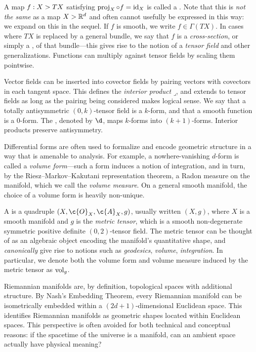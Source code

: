 \documentclass[11pt]{book}
\begin{document}
A map $f : X \-> TX$ satisfying $\operatorname{proj}_X \circ f = \operatorname{id}_X$ is called a .
Note that this is \emph{not the same} as a map $X \-> \mathbb{R}^d$ and often cannot usefully be expressed in this way: we expand on this in the sequel.
If $f$ is smooth, we write $f \in \Gamma(TX)$.
In cases where $TX$ is replaced by a general bundle, we say that $f$ is a \emph{cross-section}, or simply a , of that bundle---this gives rise to the notion of a \emph{tensor field} and other generalizations.
Functions can multiply against tensor fields by scaling them pointwise.

Vector fields can be inserted into covector fields by pairing vectors with covectors in each tangent space.
This defines the \emph{interior product} $\mathbin{\lrcorner}$, and extends to tensor fields as long as the pairing being considered makes logical sense.
We say that a totally antisymmetric $(0,k)$-tensor field is a $k$-form, and that a smooth function is a $0$-form.
The , denoted by $\d$, maps $k$-forms into $(k+1)$-forms.
Interior products preserve antisymmetry.

Differential forms are often used to formalize and encode geometric structure in a way that is amenable to analysis.
For example, a nowhere-vanishing $d$-form is called a \emph{volume form}---such a form induces a notion of integration, and in turn, by the Riesz--Markov--Kakutani representation theorem, a Radon measure on the manifold, which we call the \emph{volume measure}.
On a general smooth manifold, the choice of a volume form is heavily non-unique.

A  is a quadruple $(X,\c{O}_X,\c{A}_X,g)$, usually written $(X,g)$, where $X$ is a smooth manifold and $g$ is the \emph{metric tensor}, which is a smooth non-degenerate symmetric positive definite $(0,2)$-tensor field.
The metric tensor can be thought of as an algebraic object encoding the manifold's quantitative shape, and \emph{canonically} give rise to notions such as \emph{geodesics}, \emph{volume}, \emph{integration}.
In particular, we denote both the volume form and volume measure induced by the metric tensor as $\operatorname{vol}_g$.

Riemannian manifolds are, by definition, topological spaces with additional structure.
By Nash's Embedding Theorem, every Riemannian manifold can be isometrically embedded within a $(2d+1)$-dimensional Euclidean space.
This identifies Riemannian manifolds as geometric shapes located within Euclidean spaces.
This perspective is often avoided for both technical and conceptual reasons: if the spacetime of the universe is a manifold, can an ambient space actually have physical meaning?
\end{document}
